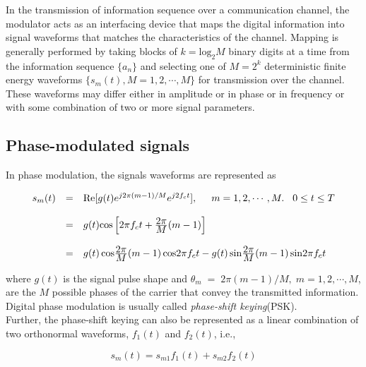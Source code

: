 In the transmission of information sequence over a communication channel, the modulator acts as an interfacing device that maps the digital information into signal waveforms that matches the characteristics of the channel. Mapping is generally performed by taking blocks of $k=\mathrm{log_2}M$ binary digits at a time from the information sequence $\{a_n\}$ and selecting one of $M=2^k$ deterministic finite energy waveforms $\{s_m(t),M=1,2,\cdots,M\}$ for transmission over the channel.\\

These waveforms may differ either in amplitude or in phase or in frequency or with some combination of two or more signal parameters. 

\subsection{Phase-modulated signals}

In phase modulation, the signals waveforms are represented as

\begin{eqnarray}
\begin{array}{lll}
s_m(t)&=&\mathrm{Re}[g(t)e^{j2\pi(m-1)/M}e^{j2f_ct}],\hspace{5mm}m=1,2,\cdots,M.\hspace{3mm}0\leq t \leq T \\ \\
&=&g(t)\mathrm{cos}\left [2\pi f_c t+\frac{\hbox{$2\pi$}}{\hbox{$M$}}(m-1)\right ] \\ \\
&=&g(t)\,\mathrm{cos}\frac{\hbox{$2\pi$}}{\hbox{$M$}}(m-1)\,\mathrm{cos}2\pi f_c t - g(t)\,\mathrm{sin}\frac{\hbox{$2\pi$}}{\hbox{$M$}}(m-1)\,\mathrm{sin}2\pi f_c t
\end{array}
\end{eqnarray}

where $g(t)$ is the signal pulse shape and $\theta_m\;=\;2\pi(m-1)/M,\;m=1,2,\cdots,M$, are the $M$ possible phases of the carrier that convey the transmitted information. \\

Digital phase modulation is usually called \textit{phase-shift keying}(PSK). \\

Further, the phase-shift keying can also be represented as a linear combination of two orthonormal waveforms, $f_1(t)$ and $f_2(t)$, i.e.,

\begin{equation}
s_m(t)=s_{m1}f_1(t)+s_{m2}f_2(t)
\end{equation}

